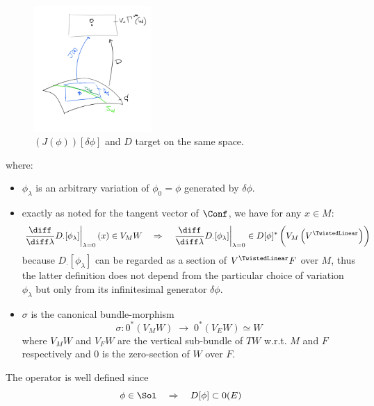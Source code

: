 \documentclass[a4paper,12pt]{scrartcl}  %
\begin{document}
\begin{figure}
\centering
\includegraphics[width=0.40\textwidth]{Pictures/Jacobi.png}
\caption{\footnotesize \label{fig:jacobi}$ \left(J(\phi)\right) [ \delta\phi ]$ and $D$ target on the same space.}
\end{figure}
where:
\begin{itemize}
	\item $\phi_\lambda$ is an arbitrary variation of $\phi_0 = \phi$ generated by $\delta\phi$.
	\item exactly as noted for the tangent vector of $\Conf$, we have for any $x\in M$:
		\begin{displaymath}
			\left.\dfrac{\diff}{\diff \lambda} D_\cdot [\phi_\lambda]\right\rvert_{\lambda=0}(x) \in V_M W
			\quad \Rightarrow \quad
			\left.\dfrac{\diff}{\diff \lambda} D_\cdot [\phi_\lambda]\right\rvert_{\lambda=0} \in D[\phi]^\ast \left( V_M \left( V^\TwistedLinear \right)\right)
		\end{displaymath}
		because $D_\cdot[\phi_\lambda]$ can be regarded as a section of $V^\TwistedLinear F$ over $M$, 
		thus the latter definition does not depend from the particular choice of variation $\phi_\lambda$ 
		but only from its infinitesimal generator $\delta\phi$.
	\item $\sigma$ is the canonical bundle-morphism
		\begin{displaymath}
			\sigma:  0^\ast \left( V_M W \right)  \; \rightarrow \;  0^\ast \left(V_E W \right) \simeq W
		\end{displaymath}
		 where $V_M W$ and $V_F W$ are the vertical sub-bundle of $T W$ w.r.t. $M$ and $F$ respectively 
		 and $0$ is the zero-section of $W$ over $F$.
\end{itemize}

The operator is well defined since
\begin{displaymath}
	\phi \in \Sol \quad \Rightarrow \quad D[\phi] \subset 0(E)
\end{displaymath}
\end{document}
